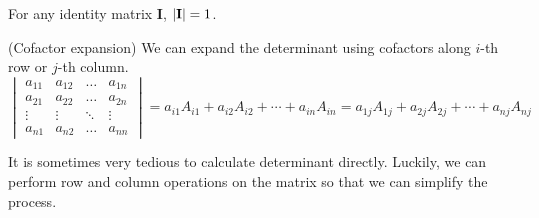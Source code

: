 \documentclass{huhtakm-template-book}
\begin{document}
\begin{lem}
    For any identity matrix $\mathbf{I}$, $\left|{\mathbf{I}}\right|=1$.
\end{lem}
\begin{thm}(Cofactor expansion)
    We can expand the determinant using cofactors along $i$-th row or $j$-th column.
    \begin{equation*}
        \begin{vmatrix}
            a_{11} & a_{12} & \hdots & a_{1n}\\
            a_{21} & a_{22} & \hdots & a_{2n}\\
            \vdots & \vdots & \ddots & \vdots\\
            a_{n1} & a_{n2} & \hdots & a_{nn}
        \end{vmatrix}=a_{i1}A_{i1}+a_{i2}A_{i2}+\cdots+a_{in}A_{in}=a_{1j}A_{1j}+a_{2j}A_{2j}+\cdots+a_{nj}A_{nj}
    \end{equation*}
\end{thm}
It is sometimes very tedious to calculate determinant directly. Luckily, we can perform row and column operations on the matrix so that we can simplify the process.
\end{document}
